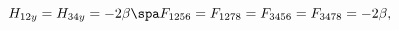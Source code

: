 \begin{equation}
\label{fluxG5IIA}
H_{12y} = H_{34y} = - 2\beta 
\spa
F_{1256} = F_{1278} = F_{3456} = F_{3478} = - 2\beta,
\end{equation}


